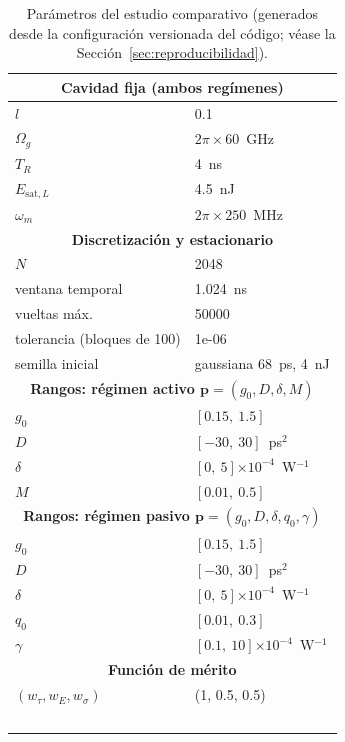 \begin{table}[htbp]
  \centering\small
  \caption{Parámetros del estudio comparativo (generados desde la
  configuración versionada del código; véase la Sección~\ref{sec:reproducibilidad}).}
  \label{tab:parametros_estudio}
  \begin{tabular}{ll}
    \hline\multicolumn{2}{c}{\textbf{Cavidad fija (ambos regímenes)}}\\\hline
    $l$ & 0.1 \\
    $\Omega_g$ & $2\pi\times60$~GHz \\
    $T_R$ & 4~ns \\
    $E_{\mathrm{sat},L}$ & 4.5~nJ \\
    $\omega_m$ & $2\pi\times250$~MHz \\
    \hline\multicolumn{2}{c}{\textbf{Discretización y estacionario}}\\\hline
    $N$ & 2048 \\
    ventana temporal & 1.024~ns \\
    vueltas máx. & 50000 \\
    tolerancia (bloques de 100) & 1e-06 \\
    semilla inicial & gaussiana 68~ps, 4~nJ \\
    \hline\multicolumn{2}{c}{\textbf{Rangos: régimen activo $\mathbf{p}=(g_0,D,\delta,M)$}}\\\hline
    $g_0$ & $[0.15,\ 1.5]$ \\
    $D$ & $[-30,\ 30]$~ps$^2$ \\
    $\delta$ & $[0,\ 5]$$\times10^{-4}$~W$^{-1}$ \\
    $M$ & $[0.01,\ 0.5]$ \\
    \hline\multicolumn{2}{c}{\textbf{Rangos: régimen pasivo $\mathbf{p}=(g_0,D,\delta,q_0,\gamma)$}}\\\hline
    $g_0$ & $[0.15,\ 1.5]$ \\
    $D$ & $[-30,\ 30]$~ps$^2$ \\
    $\delta$ & $[0,\ 5]$$\times10^{-4}$~W$^{-1}$ \\
    $q_0$ & $[0.01,\ 0.3]$ \\
    $\gamma$ & $[0.1,\ 10]$$\times10^{-4}$~W$^{-1}$ \\
    \hline\multicolumn{2}{c}{\textbf{Función de mérito}}\\\hline
    $(w_\tau, w_E, w_\sigma)$ & (1, 0.5, 0.5) \\
$$
\end{tabular}
\end{table}
